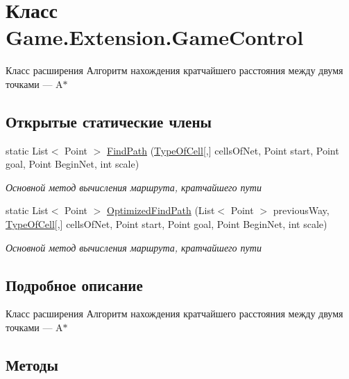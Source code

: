 \hypertarget{class_game_1_1_extension_1_1_game_control}{}\section{Класс Game.\+Extension.\+Game\+Control}
\label{class_game_1_1_extension_1_1_game_control}


Класс расширения Алгоритм нахождения кратчайшего расстояния между двумя точками — A$\ast$  


\subsection*{Открытые статические члены}
\begin{DoxyCompactItemize}
\item 
static List$<$ Point $>$ \hyperlink{class_game_1_1_extension_1_1_game_control_a011fc710c60ead3c70da0dd2469fdeaf}{Find\+Path} (\hyperlink{namespace_game_1_1_enums_ab6782702f41f926eb2b923ee03a88069}{Type\+Of\+Cell}\mbox{[},\mbox{]} cells\+Of\+Net, Point start, Point goal, Point Begin\+Net, int scale)
\begin{DoxyCompactList}\small\item\em Основной метод вычисления маршрута, кратчайшего пути \end{DoxyCompactList}\item 
static List$<$ Point $>$ \hyperlink{class_game_1_1_extension_1_1_game_control_a25de72a65a2d4408d800805e7a721e74}{Optimized\+Find\+Path} (List$<$ Point $>$ previous\+Way, \hyperlink{namespace_game_1_1_enums_ab6782702f41f926eb2b923ee03a88069}{Type\+Of\+Cell}\mbox{[},\mbox{]} cells\+Of\+Net, Point start, Point goal, Point Begin\+Net, int scale)
\begin{DoxyCompactList}\small\item\em Основной метод вычисления маршрута, кратчайшего пути \end{DoxyCompactList}\end{DoxyCompactItemize}


\subsection{Подробное описание}
Класс расширения Алгоритм нахождения кратчайшего расстояния между двумя точками — A$\ast$ 



\subsection{Методы}
\mbox{\label{class_game_1_1_extension_1_1_game_control_a011fc710c60ead3c70da0dd2469fdeaf}} 
